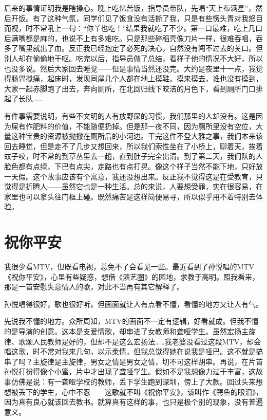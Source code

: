 后来的事情证明我是瞎操心。晚上吃忆苦饭，指导员带队，先唱“天上布满星”，然后开饭。有了这种气氛，同学们见了饭食没有活撕了我，只是有些愣头青对我怒目而视，时不常吼上一句：“你丫也吃！”结果我就吃了不少。第一口最难，吃上几口后满嘴都是麻的，也说不上有多难吃。只是那些碎稻壳像刀片一样，很难吞咽，吞多了嘴里就出了血。反正我已经抱定了必死的决心，自然没有闯不过去的关口。但别人却在偷偷地干呕。吃完以后，指导员做了总结，看样子他的情况不大好，所以也没多说。然后大家回去睡觉——但是事情当然还没完。大约是夜里十一点，我觉得肠胃搅痛，起床时，发现同屋几个人都在地上摸鞋。摸来摸去，谁也没有摸到，大家一起赤脚跑了出去，奔向厕所，在北回归线下皎洁的月色下，看到厕所门口排起了长队…… 

有件事需要说明，有些不文明的人有放野屎的习惯，我们那里的人却没有。这是因为屎有作肥料的价值，不能随便扔掉。但是那一夜不同，因为厕所里没有空位，大量这种宝贵的资源被抛撒在厕所后的小河边。干完这件不登大雅之事，我们本来该回去睡觉，但是走不了几步又想回来，所以我们索性坐在了小桥上，聊着天，挨着蚊子咬，时不常的到草丛里去一趟，直到肚子完全出清。到了第二天，我们队的人脸色都有点绿，下巴有点尖，走路也有点打晃。像这个样子当然不能下地，只好放一天假。这个故事应该有个寓意，我还没想出来。反正我不觉得这是在受教育，只觉得是折腾人——虽然它也是一种生活。总的来说，人要想受罪，实在很容易，在家里也可以拿头往门框上碰。既然痛苦是这样简便易寻，所以似乎用不着特别去体验。
 
\chapter{祝你平安}

我很少看MTV，但既看电视，总免不了会看见一些。最近看到了孙悦唱的MTV《祝你平安》，心里有些疑惑，想借《演艺圈》的园地，求教于高明。照我看来，那是一首安慰失意情人的歌，对此不当再有其它解释了。 

孙悦唱得很好，歌也很好听。但画面就让人有点看不懂，看懂的地方又让人有气。 

先说我不懂的地方。众所周知，MTV的画面不一定有逻辑，好看就成。但我不懂的是导演的创意。这本是支爱情歌，却串进了女教师和聋哑学生。虽然宏扬主旋律、歌颂人民教师是好的，但却不是这么宏扬法……我老婆没看过这段MTV，却会唱这歌，时不常对我来几句，以示柔情，但我总觉得她在说我是哑巴。这不就是搞串了吗？主旋律是主旋律，男女之情是男女之情，切不可这样胡串。再说，在片首孙悦打扮得像个小蜜，片中才出现了聋哑学生。假如不是我想像力过于丰富，这故事仿佛是说：有一聋哑学校的教师，丢下学生跑到深圳，傍上了大款。回过头来想想被丢下的学生，心中不忍——这歌就不叫《祝你平安》，该叫作《鳄鱼的眼泪》，因为真有良心就该回去教书。就算真有这样的事，也只是极个别的现象，没有普遍意义。 

